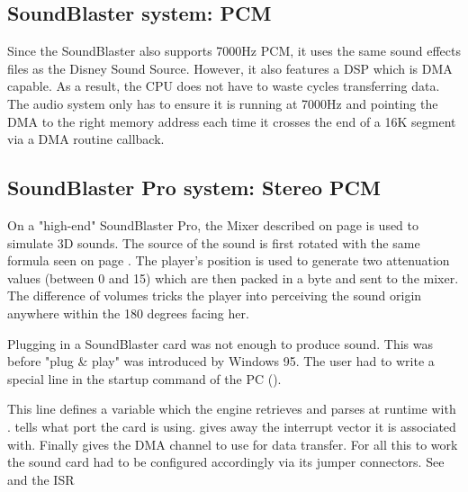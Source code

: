 \par
\subsection{SoundBlaster system: PCM}
Since the SoundBlaster also supports 7000Hz PCM, it uses the same sound effects files as the Disney Sound Source. However, it also features a DSP which is DMA capable. As a result, the CPU does not have to waste cycles transferring data. The audio system only has to ensure it is running at 7000Hz and pointing the DMA to the right memory address each time it crosses the end of a 16K segment via a DMA routine callback.
\par








\par
\subsection{SoundBlaster Pro system: Stereo PCM}
\par

On a "high-end" SoundBlaster Pro, the Mixer described on page \pageref{sbmixerpage} is used to simulate 3D sounds. The source of the sound is first rotated with the same formula seen on page \pageref{rotatematrix}. The player's position is used to generate two attenuation values (between 0 and 15) which are then packed in a byte and sent to the mixer. The difference of volumes tricks the player into perceiving the sound origin anywhere within the 180 degrees facing her.\\
\par 
\begin{minipage}{\textwidth}

\end{minipage}
\par
{} Plugging in a SoundBlaster card was not enough to produce sound. This was before "plug \& play" was introduced by Windows 95. The user had to write a special line in the startup command of the PC ().\\
\par 
\begin{minipage}{\textwidth}

\end{minipage}
\par
This line defines a variable  which the engine retrieves and parses at runtime with .  tells what port the card is using.  gives away the interrupt vector it is associated with. Finally  gives the DMA channel to use for data transfer. For all this to work the sound card had to be configured accordingly via its jumper connectors.
See  and the ISR  




